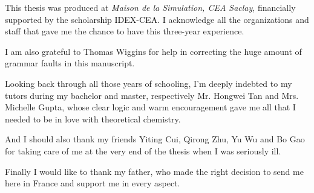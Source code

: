 This thesis was produced at\textit{ Maison de la Simulation, CEA Saclay},
financially supported by the schola\textcolor{black}{rship IDEX-CEA.
I }acknowledge all the organizations and staff that gave me the chance
to have this three-year experience.

I am also grateful to Thomas Wiggins for help in correcting the huge
amount of grammar faults in this manuscript.

Looking back through all those years of schooling, I'm deeply indebted
to my tutors during my bachelor and master, respectively Mr. Hongwei
Tan and Mrs. Michelle Gupta, whose clear logic and warm encouragement
gave me all that I needed to be in love with theoretical chemistry.

And I should also thank my friends Yiting Cui, Qirong Zhu, Yu Wu and
Bo Gao for taking care of me at the very end of the thesis when I
was seriously ill.

Finally I would like to thank my father, who made the right decision
to send me here in France and support me in every aspect.

\endgroup
